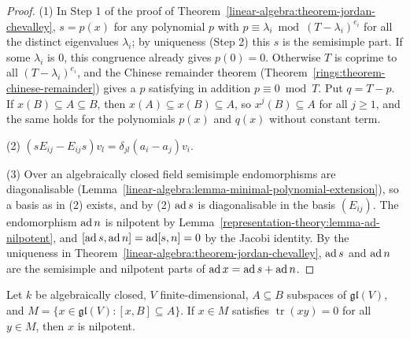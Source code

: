 \begin{proof}
(1) In Step 1 of the proof of Theorem~\ref{linear-algebra:theorem-jordan-chevalley}, $s = p(x)$ for any polynomial $p$ with $p \equiv \lambda_i \bmod (T - \lambda_i)^{e_i}$ for all
the distinct eigenvalues $\lambda_i$; by uniqueness (Step 2) this $s$ is the semisimple part. If some $\lambda_i$ is $0$, this congruence already gives $p(0) = 0$. Otherwise $T$ is
coprime to all $(T - \lambda_i)^{e_i}$, and the Chinese remainder theorem (Theorem~\ref{rings:theorem-chinese-remainder}) gives a $p$ satisfying in addition
$p \equiv 0 \bmod T$. Put $q = T - p$. If $x(B) \subseteq A \subseteq B$, then $x(A) \subseteq x(B) \subseteq A$, so $x^j(B) \subseteq A$ for all $j \geq 1$, and the same holds for
the polynomials $p(x)$ and $q(x)$ without constant term.

(2) $(sE_{ij} - E_{ij}s)v_l = \delta_{jl}(a_i - a_j)v_i$.

(3) Over an algebraically closed field semisimple endomorphisms are diagonalisable (Lemma~\ref{linear-algebra:lemma-minimal-polynomial-extension}), so a basis as in (2)
exists, and by (2) $\operatorname{ad} s$ is diagonalisable in the basis $(E_{ij})$. The endomorphism $\operatorname{ad} n$ is nilpotent by Lemma~\ref{representation-theory:lemma-ad-nilpotent}, and
$[\operatorname{ad} s, \operatorname{ad} n] = \operatorname{ad}[s, n] = 0$ by the Jacobi identity. By the uniqueness in Theorem~\ref{linear-algebra:theorem-jordan-chevalley}, $\operatorname{ad} s$ and $\operatorname{ad} n$ are the semisimple and
nilpotent parts of $\operatorname{ad} x = \operatorname{ad} s + \operatorname{ad} n$.
\end{proof}

\begin{lemma}\label{representation-theory:lemma-cartan-trace}
Let $k$ be algebraically closed, $V$ finite-dimensional, $A \subseteq B$ subspaces of $\mathfrak{gl}(V)$, and $M = \{x \in \mathfrak{gl}(V) : [x, B] \subseteq A\}$. If $x \in M$
satisfies $\operatorname{tr}(xy) = 0$ for all $y \in M$, then $x$ is nilpotent.
\end{lemma}

